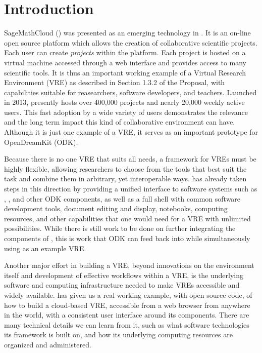 \documentclass{deliverablereport}
\author{Erik Bray}
\renewcommand{\SMC}{\software{SMC}}
\begin{document}
\maketitle
\strut\githubissuedescription
\newpage\tableofcontents\newpage

\section{Introduction}

SageMathCloud (\SMC) was presented as an emerging technology in
. It is an on-line open source platform which allows
the creation of collaborative scientific projects. Each user can create
\emph{projects} within the platform. Each project is hosted on a \Linux virtual
machine accessed through a web interface and provides access to many scientific
tools.  It is thus an important working example of a Virtual Research
Environment (VRE) as described in Section 1.3.2 of the Proposal, with
capabilities suitable for reasearchers, software developers, and teachers.
Launched in 2013, \SMC presently hosts over 400,000 projects and nearly 20,000
weekly active users. This fast adoption by a wide variety of users demonstrates
the relevance and the long term impact this kind of collaborative environment
can have.  Although it is just one example of a VRE, it serves as an important
prototype for OpenDreamKit (ODK).

Because there is no one VRE that suits all needs, a framework for VREs must be
highly flexible, allowing researchers to choose from the tools that best suit
the task and combine them in arbitrary, yet interoperable ways.  \SMC has
already taken steps in this direction by providing a unified interface to
software systems such as \Sage, \GAP, and other ODK components, as
well as a full \Linux shell with common software development tools, \LATEX
document editing and display, \Jupyter notebooks, computing resources, and
other capabilities that one would need for a VRE with unlimited possibilities.
While there is still work to be done on further integrating the components of
\SMC, this is work that ODK can feed back into \SMC while
simultaneously using \SMC as an example VRE.

Another major effort in building a VRE, beyond innovations on the environment
itself and development of effective workflows within a VRE, is the underlying
software and computing infrastructure needed to make VREs accessible and widely
available.  \SMC has given us a real working example, with open source code, of
how to build a cloud-based VRE, accessible from a web browser from anywhere in
the world, with a consistent user interface around its components.  There are
many technical details we can learn from it, such as what software technologies
its framework is built on, and how its underlying computing resources are
organized and administered.
\end{document}
